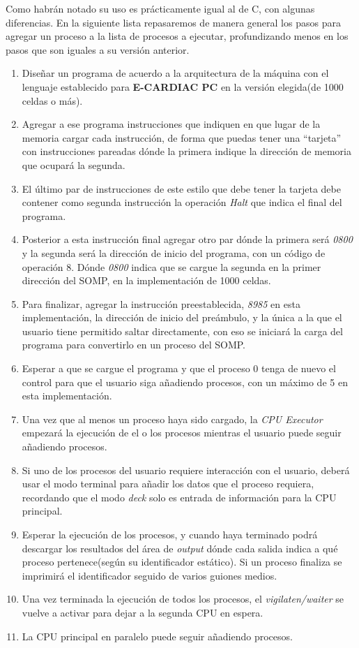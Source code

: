 \documentclass[letterpaper,12pt,oneside]{book}
\begin{document}
			Como habrán notado su uso es prácticamente igual al de C, con algunas diferencias. En la siguiente lista repasaremos de manera general
			los pasos para agregar un proceso a la lista de procesos a ejecutar, profundizando menos en los pasos que son iguales a su versión anterior.			
			\begin{enumerate}

				\item Diseñar un programa de acuerdo a la arquitectura de la máquina con el lenguaje establecido para \textbf{E-CARDIAC PC} en
				la versión elegida(de 1000 celdas o más).
				\item Agregar a ese programa instrucciones que indiquen en que lugar de la memoria cargar cada instrucción, de forma que puedas tener
				una ``tarjeta'' con instrucciones pareadas dónde la primera indique la dirección de memoria que ocupará la segunda.
				\item El último par de instrucciones de este estilo que debe tener la tarjeta debe contener como segunda instrucción
				la operación \textit{Halt} que indica el final del programa.
				\item Posterior a esta instrucción final agregar otro par dónde la primera será \textit{0800} y la segunda será la dirección de inicio del
				programa, con un código de operación 8. Dónde \textit{0800} indica que se cargue la segunda en la primer dirección del SOMP, en
				la implementación de 1000 celdas.
				\item Para finalizar, agregar la instrucción preestablecida, \textit{8985} en esta implementación, la dirección de inicio del preámbulo, y
				la única a la que el usuario tiene permitido saltar directamente, con eso se iniciará la carga del programa para convertirlo en
				un proceso del SOMP.
				\item Esperar a que se cargue el programa y que el proceso 0 tenga de nuevo el control para que el usuario siga añadiendo procesos, con un
				máximo de 5 en esta implementación.
				\item Una vez que al menos un proceso haya sido cargado, la \textit{CPU Executor} empezará la ejecución de el o los procesos
				mientras el usuario puede seguir añadiendo procesos.
				\item Si uno de los procesos del usuario requiere interacción con el usuario, deberá usar el modo terminal para añadir los
				datos que el proceso requiera, recordando que el modo \textit{deck} solo es entrada de información para la CPU principal.
				\item Esperar la ejecución de los procesos, y cuando haya terminado podrá descargar los resultados del área de \textit{output} dónde
				cada salida indica a qué proceso pertenece(según su identificador estático). Si un proceso finaliza se imprimirá el identificador
				seguido de varios guiones medios.
				\item Una vez terminada la ejecución de todos los procesos, el \textit{vigilaten/waiter} se vuelve a activar para dejar a la segunda CPU en espera.
				\item La CPU principal en paralelo puede seguir añadiendo procesos.
				
			\end{enumerate}
			
\end{document}
